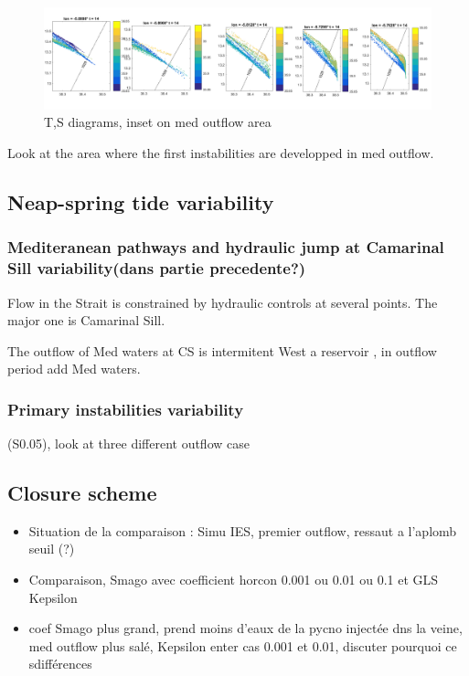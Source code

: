 \begin{figure}[!h]
 \includegraphics[width=\textwidth]{./GBR3D/TS_coupesCso14h.png}
 \caption {T,S diagrams, inset on med outflow area}
\end{figure}

Look at the area where the first instabilities are developped in med outflow.

\subsection{Neap-spring tide variability}
\subsubsection{Mediteranean pathways and hydraulic jump at Camarinal Sill variability(dans partie precedente?)}

Flow in the Strait is constrained by hydraulic controls at several points. The major one is Camarinal Sill.

The outflow of Med waters at CS is intermitent
West a reservoir , in outflow period add Med waters.




\subsubsection{Primary instabilities variability}

(S0.05), look at three different outflow case





\subsection{Closure scheme}

\begin{itemize}
\item Situation de la comparaison : Simu IES, premier outflow, ressaut a l'aplomb seuil (?)
\item Comparaison, Smago avec coefficient horcon 0.001 ou 0.01 ou 0.1  et GLS Kepsilon
\item coef Smago plus grand, prend moins d'eaux de la pycno injectée dns la veine, med outflow plus salé, Kepsilon enter cas 0.001 et 0.01, discuter pourquoi ce sdifférences
\end{itemize}

